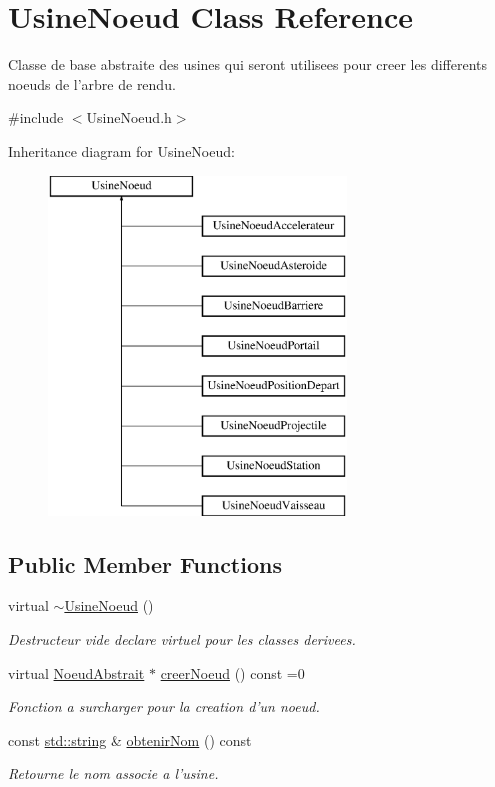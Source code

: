 \hypertarget{class_usine_noeud}{\section{Usine\-Noeud Class Reference}
\label{class_usine_noeud}
}


Classe de base abstraite des usines qui seront utilisees pour creer les differents noeuds de l'arbre de rendu.  




{\ttfamily \#include $<$Usine\-Noeud.\-h$>$}

Inheritance diagram for Usine\-Noeud\-:\begin{figure}[H]
\begin{center}
\leavevmode
\includegraphics[height=9.000000cm]{class_usine_noeud}
\end{center}
\end{figure}
\subsection*{Public Member Functions}
\begin{DoxyCompactItemize}
\item 
virtual \hyperlink{class_usine_noeud_a1599bf38e75c61c68af55fc4d1e1059c}{$\sim$\-Usine\-Noeud} ()
\begin{DoxyCompactList}\small\item\em Destructeur vide declare virtuel pour les classes derivees. \end{DoxyCompactList}\item 
virtual \hyperlink{class_noeud_abstrait}{Noeud\-Abstrait} $\ast$ \hyperlink{class_usine_noeud_a47c1970af3739268f5e4a35cb451d528}{creer\-Noeud} () const =0
\begin{DoxyCompactList}\small\item\em Fonction a surcharger pour la creation d'un noeud. \end{DoxyCompactList}\item 
const \hyperlink{glew_8h_ae84541b4f3d8e1ea24ec0f466a8c568b}{std\-::string} \& \hyperlink{group__inf2990_ga78cfb214df5805c43d4ca4b71411d060}{obtenir\-Nom} () const 
\begin{DoxyCompactList}\small\item\em Retourne le nom associe a l'usine. \end{DoxyCompactList}\end{DoxyCompactItemize}
